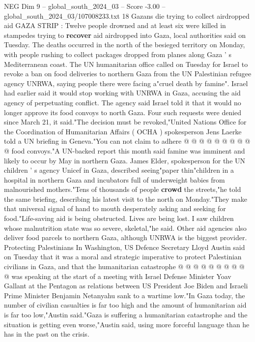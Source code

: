 \begin{textsample}{NEG Dim 9 – global\_south\_2024\_03 – Score -3.00 – global\_south\_2024\_03/107008233.txt}  \label{ex:f9_neg_379}
18 Gazans die trying to collect airdropped aid GAZA STRIP : Twelve people drowned and at least six were killed in stampedes trying to \textbf{recover} aid airdropped into Gaza, local authorities said on Tuesday.
The deaths occurred in the north of the besieged territory on Monday, with people rushing to collect packages dropped from planes along Gaza ' s Mediterranean coast.
The UN humanitarian office called on Tuesday for Israel to revoke a ban on food deliveries to northern Gaza from the UN Palestinian refugee agency UNRWA, saying people there were facing a"cruel death by famine".
Israel had earlier said it would stop working with UNRWA in Gaza, accusing the aid agency of perpetuating conflict.
The agency said Israel told it that it would no longer approve its food convoys to north Gaza.
Four such requests were denied since March 21, it said."The decision must be revoked,"United Nations Office for the Coordination of Humanitarian Affairs ( OCHA ) spokesperson Jens Laerke told a UN briefing in Geneva."You can not claim to adhere @ @ @ @ @ @ @ @ @ @ food convoys."A UN-backed report this month said famine was imminent and likely to occur by May in northern Gaza.
James Elder, spokesperson for the UN children ' s agency Unicef in Gaza, described seeing"paper thin"children in a hospital in northern Gaza and incubators full of underweight babies from malnourished mothers."Tens of thousands of people \textbf{crowd} the streets,"he told the same briefing, describing his latest visit to the north on Monday."They make that universal signal of hand to mouth desperately asking and seeking for food."Life-saving aid is being obstructed.
Lives are being lost.
I saw children whose malnutrition state was so severe, skeletal,"he said.
Other aid agencies also deliver food parcels to northern Gaza, although UNRWA is the biggest provider.
Protecting Palestinians In Washington, US Defence Secretary Lloyd Austin said on Tuesday that it was a moral and strategic imperative to protect Palestinian civilians in Gaza, and that the humanitarian catastrophe @ @ @ @ @ @ @ @ @ @ was speaking at the start of a meeting with Israel Defense Minister Yoav Gallant at the Pentagon as relations between US President Joe Biden and Israeli Prime Minister Benjamin Netanyahu sank to a wartime low."In Gaza today, the number of civilian casualties is far too high and the amount of humanitarian aid is far too low,"Austin said."Gaza is suffering a humanitarian catastrophe and the situation is getting even worse,"Austin said, using more forceful language than he has in the past on the crisis.

\end{textsample}
